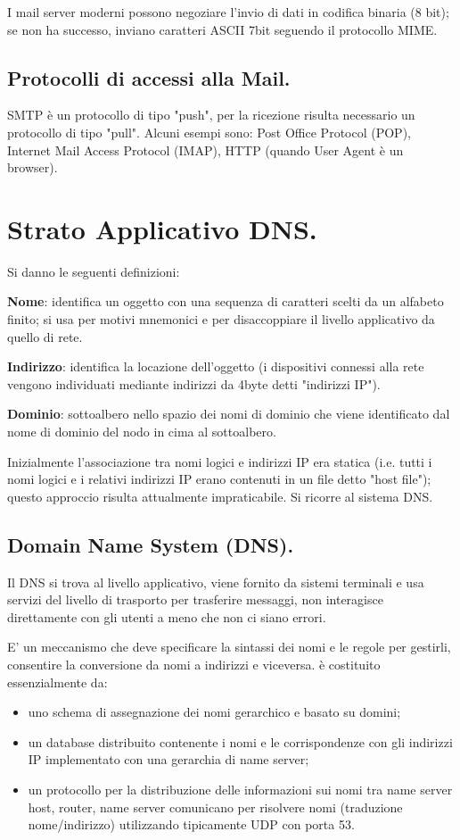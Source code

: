 \documentclass[11pt, italian, openany]{book}
\begin{document}
\begin{sloppypar}
I mail server moderni possono negoziare l'invio di dati in codifica binaria (8 bit); se non ha successo, inviano caratteri ASCII 7bit seguendo
il protocollo MIME.

\subsection*{Protocolli di accessi alla Mail.}
SMTP \`e un protocollo di tipo "push", per la ricezione risulta necessario un protocollo di tipo "pull". Alcuni esempi sono: Post Office Protocol
(POP), Internet Mail Access Protocol (IMAP), HTTP (quando User Agent è un browser).

\section*{Strato Applicativo DNS.}
Si danno le seguenti definizioni:

\textbf{Nome}: identifica un oggetto con una sequenza di caratteri scelti da un alfabeto finito; si usa per motivi mnemonici e per disaccoppiare
il livello applicativo da quello di rete.

\textbf{Indirizzo}: identifica la locazione dell'oggetto (i dispositivi connessi alla rete vengono individuati mediante indirizzi da 4byte detti
"indirizzi IP").

\textbf{Dominio}: sottoalbero nello spazio dei nomi di dominio che viene identificato dal nome di dominio del nodo in cima al sottoalbero.


Inizialmente l'associazione tra nomi logici e indirizzi IP era statica (i.e. tutti i nomi logici e i relativi indirizzi IP erano contenuti in
un file detto "host file"); questo approccio risulta attualmente impraticabile. Si ricorre al sistema DNS.

\subsection*{Domain Name System (DNS).}
Il DNS si trova al livello applicativo, viene fornito da sistemi terminali e usa servizi del livello di trasporto per trasferire messaggi,
non interagisce direttamente con gli utenti a meno che non ci siano errori.

E' un meccanismo che deve specificare la sintassi dei nomi e le regole per gestirli, consentire la conversione da nomi a indirizzi e viceversa.
è costituito essenzialmente da:
\begin{itemize}[topsep=0pt]
	\itemsep-0.3em
	\item uno schema di assegnazione dei nomi gerarchico e basato su domini;
	\item un database distribuito contenente i nomi e le corrispondenze con gli indirizzi IP implementato con una gerarchia di name server;
	\item un protocollo per la distribuzione delle informazioni sui nomi tra name server host, router, name server comunicano per risolvere nomi
	(traduzione nome/indirizzo) utilizzando tipicamente UDP con porta 53.
\end{itemize}


\end{sloppypar}
\end{document}
